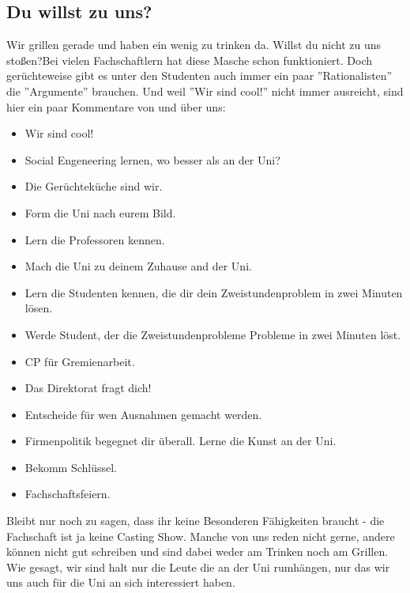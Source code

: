 \subsection{Du willst zu uns?}
    \glqq Wir grillen gerade und haben ein wenig zu trinken da. Willst du nicht zu uns stoßen?\grqq { }Bei vielen Fachschaftlern hat diese Masche schon funktioniert. Doch gerüchteweise gibt es unter den Studenten auch immer ein paar ''Rationalisten'' die ''Argumente'' brauchen. Und weil ''Wir sind cool!'' nicht immer ausreicht, sind hier ein paar Kommentare von und über uns:
    \begin{itemize}
        \item Wir sind cool!
        \item Social Engeneering lernen, wo besser als an der Uni?
        \item Die Gerüchteküche sind wir.
        \item Form die Uni nach eurem Bild.
        \item Lern die Professoren kennen.
        \item Mach die Uni zu deinem Zuhause and der Uni.
        \item Lern die Studenten kennen, die dir dein Zweistundenproblem in zwei Minuten lösen.
        \item Werde Student, der die Zweistundenprobleme Probleme in zwei Minuten löst.
        \item CP für Gremienarbeit.
        \item Das Direktorat fragt dich!
        \item Entscheide für wen Ausnahmen gemacht werden.
        \item Firmenpolitik begegnet dir überall. Lerne die Kunst an der Uni.
        \item Bekomm Schlüssel.
        \item Fachschaftsfeiern.
    \end{itemize}
    Bleibt nur noch zu sagen, dass ihr keine Besonderen F\"ahigkeiten braucht - die Fachschaft ist ja keine Casting Show.
    Manche von uns reden nicht gerne, andere k\"onnen nicht gut schreiben und sind dabei weder am Trinken noch am Grillen.
    Wie gesagt, wir sind halt nur die Leute die an der Uni rumh\"angen, nur das wir uns auch f\"ur die Uni an sich interessiert haben.

